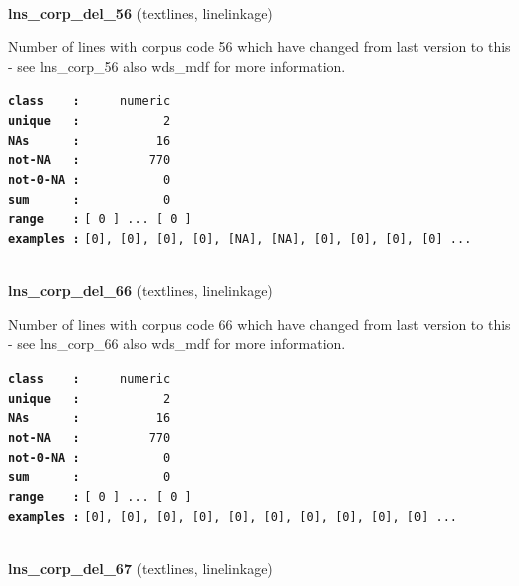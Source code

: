 \documentclass[]{article}
\begin{document}
~

\textbf{lns\_corp\_del\_56} (textlines, linelinkage)

Number of lines with corpus code 56 which have changed from last version
to this - see lns\_corp\_56 also wds\_mdf for more information.

\textbf{\texttt{class\ \ \ \ :}} \texttt{~~~~~numeric}\\
\textbf{\texttt{unique\ \ \ :}} \texttt{~~~~~~~~~~~2}\\
\textbf{\texttt{NAs\ \ \ \ \ \ :}} \texttt{~~~~~~~~~~16}\\
\textbf{\texttt{not-NA\ \ \ :}} \texttt{~~~~~~~~~770}\\
\textbf{\texttt{not-0-NA\ :}} \texttt{~~~~~~~~~~~0}\\
\textbf{\texttt{sum\ \ \ \ \ \ :}} \texttt{~~~~~~~~~~~0}\\
\textbf{\texttt{range\ \ \ \ :}}
\texttt{{[}\ 0\ {]}\ ...\ {[}\ 0\ {]}}\\
\textbf{\texttt{examples\ :}}
\texttt{{[}0{]},\ {[}0{]},\ {[}0{]},\ {[}0{]},\ {[}NA{]},\ {[}NA{]},\ {[}0{]},\ {[}0{]},\ {[}0{]},\ {[}0{]}\ ...}\\

~

\textbf{lns\_corp\_del\_66} (textlines, linelinkage)

Number of lines with corpus code 66 which have changed from last version
to this - see lns\_corp\_66 also wds\_mdf for more information.

\textbf{\texttt{class\ \ \ \ :}} \texttt{~~~~~numeric}\\
\textbf{\texttt{unique\ \ \ :}} \texttt{~~~~~~~~~~~2}\\
\textbf{\texttt{NAs\ \ \ \ \ \ :}} \texttt{~~~~~~~~~~16}\\
\textbf{\texttt{not-NA\ \ \ :}} \texttt{~~~~~~~~~770}\\
\textbf{\texttt{not-0-NA\ :}} \texttt{~~~~~~~~~~~0}\\
\textbf{\texttt{sum\ \ \ \ \ \ :}} \texttt{~~~~~~~~~~~0}\\
\textbf{\texttt{range\ \ \ \ :}}
\texttt{{[}\ 0\ {]}\ ...\ {[}\ 0\ {]}}\\
\textbf{\texttt{examples\ :}}
\texttt{{[}0{]},\ {[}0{]},\ {[}0{]},\ {[}0{]},\ {[}0{]},\ {[}0{]},\ {[}0{]},\ {[}0{]},\ {[}0{]},\ {[}0{]}\ ...}\\

~

\textbf{lns\_corp\_del\_67} (textlines, linelinkage)
\end{document}
